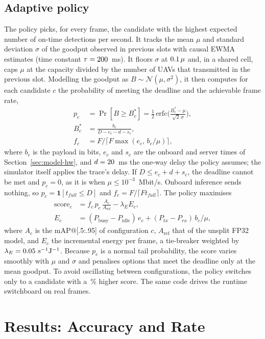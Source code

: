 \documentclass[journal,twocolumn,10pt]{IEEEtran}
\begin{document}
\subsection{Adaptive policy}
The policy picks, for every frame, the candidate with the highest expected number of on-time detections per second. It tracks the mean $\mu$ and standard deviation $\sigma$ of the goodput observed in previous slots with causal EWMA estimates (time constant $\tau=200$~ms). It floors $\sigma$ at $0.1\,\mu$ and, in a shared cell, caps $\mu$ at the capacity divided by the number of UAVs that transmitted in the previous slot. Modelling the goodput as $B\sim\mathcal{N}(\mu,\sigma^2)$, it then computes for each candidate $c$ the probability of meeting the deadline and the achievable frame rate,
\begin{align*}
p_c &= \Pr[B\ge B^\ast_c] = \tfrac12\,\mathrm{erfc}\Big(\frac{B^\ast_c-\mu}{\sqrt2\,\sigma}\Big),\\
B^\ast_c &= \frac{b_c}{D-e_c-d-s_c},\\
f_c &= F\big/\big\lceil F\max(e_c,\,b_c/\mu)\big\rceil,
\end{align*}
where $b_c$ is the payload in bits, $e_c$ and $s_c$ are the onboard and server times of Section~\ref{sec:model-hw}, and $d=20$~ms the one-way delay the policy assumes; the simulator itself applies the trace's delay. If $D\le e_c+d+s_c$, the deadline cannot be met and $p_c=0$, as it is when $\mu\le10^{-3}$~Mbit/s. Onboard inference sends nothing, so $p_c=\mathbf{1}[t_{full}\le D]$ and $f_c=F/\lceil F t_{full}\rceil$. The policy maximises
\begin{align*}
\mathrm{score}_c &= f_c\, p_c\, \frac{A_c}{A_{\mathrm{ref}}} - \lambda_E E_c,\\
E_c &= (P_{\mathrm{busy}}-P_{\mathrm{idle}})\,e_c+(P_{tx}-P_{rx})\,b_c/\mu,
\end{align*}
where $A_c$ is the mAP@[.5:.95] of configuration $c$, $A_{\mathrm{ref}}$ that of the unsplit FP32 model, and $E_c$ the incremental energy per frame, a tie-breaker weighted by $\lambda_E=0.05~\mathrm{s^{-1}J^{-1}}$. Because $p_c$ is a normal tail probability, the score varies smoothly with $\mu$ and $\sigma$ and penalises options that meet the deadline only at the mean goodput. To avoid oscillating between configurations, the policy switches only to a candidate with a \PolicyHysteresisPct\,\% higher score. The same code drives the runtime switchboard on real frames.

\section{Results: Accuracy and Rate}
\end{document}
